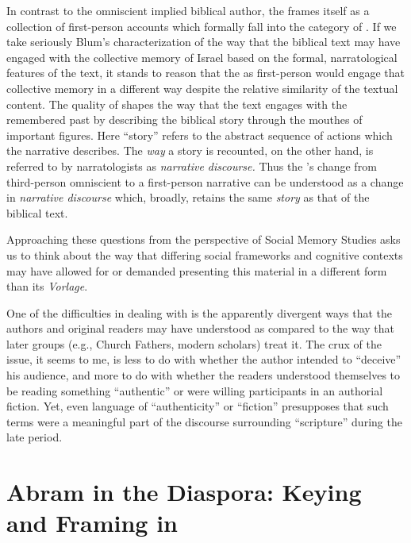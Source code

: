 In contrast to the omniscient implied biblical author, the
\ga frames itself as a collection of first-person
accounts which formally fall into the category of \psy.
If we take seriously Blum's characterization of the way that the
biblical text may have engaged with the collective memory of Israel
based on the formal, narratological features of the text, it stands to
reason that the \ga as first-person \psy
would engage that collective memory in a different way despite the
relative similarity of the textual content. The
\psgraphic quality of \ga shapes the way
that the text engages with the remembered past by describing the
biblical story through the mouthes of important figures. Here ``story''
refers to the abstract sequence of actions which the narrative
describes. The \emph{way} a story is recounted, on the other hand, is
referred to by narratologists as \emph{narrative discourse.} Thus the
\ga's change from third-person omniscient to a
\psgraphical first-person narrative can be understood as
a change in \emph{narrative discourse} which, broadly, retains the same
\emph{story} as that of the biblical text.

Approaching these questions from the perspective of Social Memory
Studies asks us to think about the way that differing social frameworks
and cognitive contexts may have allowed for or demanded presenting this
material in a different form than its \emph{Vorlage}.

One of the difficulties in dealing with \psy is the
apparently divergent ways that the authors and original readers may have
understood \psy as compared to the way that later groups
(e.g., Church Fathers, modern scholars) treat it. The crux of the issue,
it seems to me, is less to do with whether the author intended to
``deceive'' his audience, and more to do with whether the readers
understood themselves to be reading something ``authentic'' or were
willing participants in an authorial fiction. Yet, even language of
``authenticity'' or ``fiction'' presupposes that such terms were a
meaningful part of the discourse surrounding ``scripture'' during the
late \secondtemple period.

\hypertarget{abram-in-the-diaspora-keying-and-framing-in-ga}{%
\section{Abram in the Diaspora: Keying and Framing in
\GA}\label{abram-in-the-diaspora-keying-and-framing-in-ga}}

